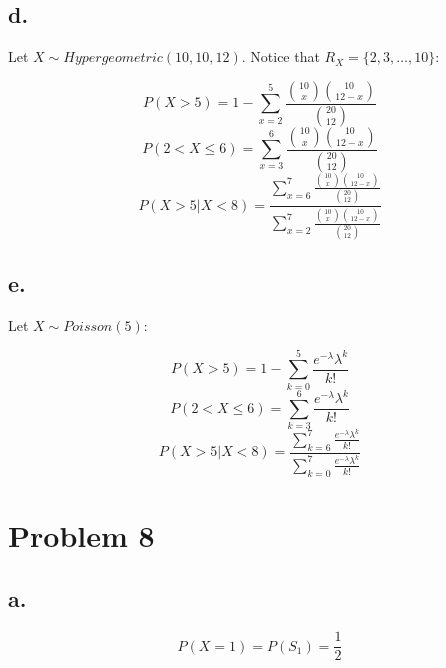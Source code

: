 \documentclass{article}
\begin{document}
\subsection*{d.}

Let \(X \sim Hypergeometric(10, 10, 12)\). Notice that \(R_{X} = \{2, 3, \dots, 10\}\):


\begin{equation*}
    P(X > 5) = 1 - \sum_{x=2}^{5}\frac{\binom{10}{x}\binom{10}{12-x}}{\binom{20}{12}}
\end{equation*}
\begin{equation*}
    P(2 < X \leq 6) = \sum_{x=3}^{6}\frac{\binom{10}{x}\binom{10}{12-x}}{\binom{20}{12}}
\end{equation*}
\begin{equation*}
    P(X>5|X<8) = \frac{\sum_{x=6}^{7}\frac{\binom{10}{x}\binom{10}{12-x}}{\binom{20}{12}}}{\sum_{x=2}^{7}\frac{\binom{10}{x}\binom{10}{12-x}}{\binom{20}{12}}}
\end{equation*}

\subsection*{e.}

Let \(X \sim Poisson(5)\):

\begin{equation*}
    P(X > 5) = 1 - \sum_{k=0}^{5}\frac{e^{- \lambda}\lambda^{k}}{k!}
\end{equation*}
\begin{equation*}
    P(2 < X \leq 6) = \sum_{k=3}^{6}\frac{e^{- \lambda}\lambda^{k}}{k!}
\end{equation*}
\begin{equation*}
    P(X>5|X<8) = \frac{\sum_{k=6}^{7}\frac{e^{- \lambda}\lambda^{k}}{k!}}{\sum_{k=0}^{7}\frac{e^{- \lambda}\lambda^{k}}{k!}}
\end{equation*}


\section*{Problem 8}

\subsection*{a.}

\begin{equation*}
    P(X = 1) = P(S_{1}) = \frac{1}{2}
\end{equation*}
\end{document}
